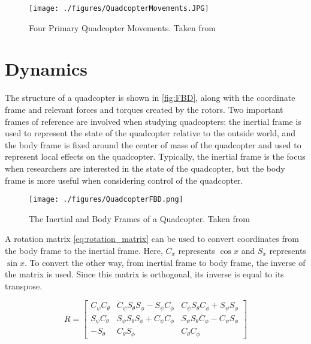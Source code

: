\documentclass[letterpaper,12pt,titlepage,oneside,final]{book}
\begin{document}
\begin{figure}
\centering
\texttt{[image: ./figures/QuadcopterMovements.JPG]}
\caption{Four Primary Quadcopter Movements. Taken from \cite{harsha}}
\label{fig:actions}
\end{figure}


\section{Dynamics} \label{sec:dynamics}


The structure of a quadcopter is shown in \autoref{fig:FBD}, along with the coordinate frame and relevant forces and torques created by the rotors.
Two important frames of reference are involved when studying quadcopters: the inertial frame is used to represent the state of the quadcopter relative to the outside world, and the body frame is fixed around the center of mass of the quadcopter and used to represent local effects on the quadcopter.
Typically, the inertial frame is the focus when researchers are interested in the state of the quadcopter, but the body frame is more useful when considering control of the quadcopter.

\begin{figure}
\centering
\texttt{[image: ./figures/QuadcopterFBD.png]}
\caption{The Inertial and Body Frames of a Quadcopter. Taken from \cite{luukkonen2011modelling} } %
\label{fig:FBD}
\end{figure}

A rotation matrix \eqref{eq:rotation_matrix} can be used to convert coordinates from the body frame to the inertial frame.
Here, $C_{x}$ represents $\cos{x}$ and $S_{x}$ represents $\sin{x}$.
To convert the other way, from inertial frame to body frame, the inverse of the matrix is used. 
Since this matrix is orthogonal, its inverse is equal to its transpose.

\begin{equation} \label{eq:rotation_matrix}
R = 
\begin{bmatrix}
C_{\psi}C_{\theta} & C_{\psi}S_{\theta}S_{\phi} - S_{\psi}C_{\phi} & C_{\psi}S_{\theta}C_{\phi} + S_{\psi}S_{\phi} \\
S_{\psi}C_{\theta} & S_{\psi}S_{\theta}S_{\phi} + C_{\psi}C_{\phi} & S_{\psi}S_{\theta}C_{\phi} - C_{\psi}S_{\phi} \\
-S_{\theta} & C_{\theta}S_{\phi} & C_{\theta}C_{\phi}
\end{bmatrix}
\end{equation}
\end{document}
